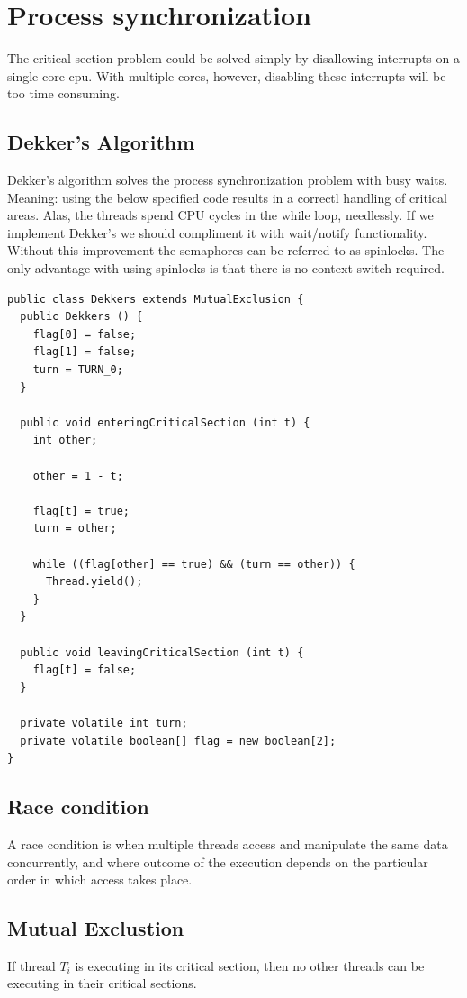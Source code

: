 \documentclass[a4paper]{article}
\begin{document}
\section{Process synchronization}

The critical section problem could be solved simply by disallowing interrupts
on a single core cpu. With multiple cores, however, disabling these interrupts
will be too time consuming.

\subsection{Dekker's Algorithm}
Dekker's algorithm solves the process synchronization problem with busy waits.
Meaning: using the below specified code results in a correctl handling of
critical areas. Alas, the threads spend CPU cycles in the while loop, needlessly.
If we implement Dekker's we should compliment it with wait/notify functionality.
Without this improvement the semaphores can be referred to as spinlocks.
The only advantage with using spinlocks is that there is no context switch
required.

\begin{lstlisting}[label=dekkers,caption=Dekker's Algorithm]
public class Dekkers extends MutualExclusion {
  public Dekkers () {
    flag[0] = false;
    flag[1] = false;
    turn = TURN_0;
  }

  public void enteringCriticalSection (int t) {
    int other;

    other = 1 - t;

    flag[t] = true;
    turn = other;

    while ((flag[other] == true) && (turn == other)) {
      Thread.yield();
    }
  }

  public void leavingCriticalSection (int t) {
    flag[t] = false;
  }

  private volatile int turn;
  private volatile boolean[] flag = new boolean[2];
}
\end{lstlisting}

\subsection{Race condition}
A race condition is when multiple threads access and manipulate the same
data concurrently, and where outcome of the execution depends on the
particular order in which access takes place.

\subsection{Mutual Exclustion}
If thread $T_i$ is executing in its critical section, then no other threads
can be executing in their critical sections.
\end{document}

